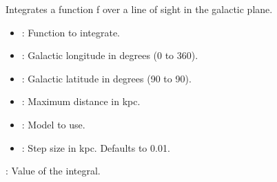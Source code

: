 \documentclass[letterpaper,10pt,english]{sphinxmanual}
\begin{document}
\begin{fulllineitems}
\begin{fulllineitems}
\label{\detokenize{ModelHelper:ModelHelper.ModelHelper.integ_d}}
\pysigstartsignatures
{}
\pysigstopsignatures
\sphinxAtStartPar
Integrates a function f over a line of sight in the galactic plane.
\begin{description}
\begin{itemize}
\item {} 
\sphinxAtStartPar
{}: Function to integrate.

\item {} 
\sphinxAtStartPar
{}: Galactic longitude in degrees (0 to 360).

\item {} 
\sphinxAtStartPar
{}: Galactic latitude in degrees (\sphinxhyphen{}90 to 90).

\item {} 
\sphinxAtStartPar
{}: Maximum distance in kpc.

\item {} 
\sphinxAtStartPar
{}: Model to use.

\item {} 
\sphinxAtStartPar
{}: Step size in kpc. Defaults to 0.01.

\end{itemize}

\sphinxAtStartPar
{}: Value of the integral.

\end{description}

\end{fulllineitems}



\end{fulllineitems}
\end{document}
